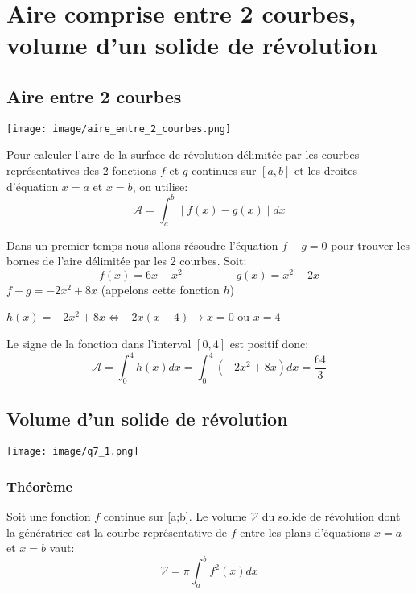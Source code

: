 \documentclass[12pt,a4paper]{report}
\begin{document}
	\chapter[Analyse]{Aire comprise entre 2 courbes, volume d'un solide de révolution}
	\section*{Aire entre 2 courbes}
	\texttt{[image: image/aire\_entre\_2\_courbes.png]}
	\vspace{1cm}
	
	Pour calculer l'aire de la surface de révolution délimitée par les courbes représentatives des 2 fonctions $f$ et $g$ continues sur $[a,b]$ et les droites d'équation $x=a$ et $x=b$, on utilise: \[ \mathcal{A}=\int_{a}^{b} \mid f(x)-g(x) \mid dx  \]
	
	Dans un premier temps nous allons résoudre l'équation $f-g=0$ pour trouver les bornes de l'aire délimitée par les 2 courbes. 
	Soit: \[f(x)=6x-x^2 \hspace{2cm} g(x)=x^2-2x \]
	$f-g=-2x^2+8x$ (appelons cette fonction $h$)
	
	$h(x)=-2x^2+8x \Leftrightarrow -2x(x-4) \rightarrow x=0$ ou $x=4$ 
	
	\vspace{1cm}
	
	Le signe de la fonction dans l'interval $[0,4]$ est positif donc: \[ \mathcal{A}= \int_{0}^{4}h(x)dx=\int_{0}^{4}(-2x^2+8x)dx=\dfrac{64}{3} \]
	
	\section*{Volume d'un solide de révolution}
	\texttt{[image: image/q7\_1.png]}
	\vspace{1cm}
	
	\subsection*{Théorème}
	Soit une fonction $f$ continue sur [a;b]. Le volume $\mathcal{V}$ du solide de révolution dont la génératrice est la courbe représentative de $f$ entre les plans d'équations $x=a$ et $x=b$ vaut: \[ \mathcal{V}=\pi \int_{a}^{b} f^2(x)dx \]
	
	\vspace{1cm}
\end{document}
